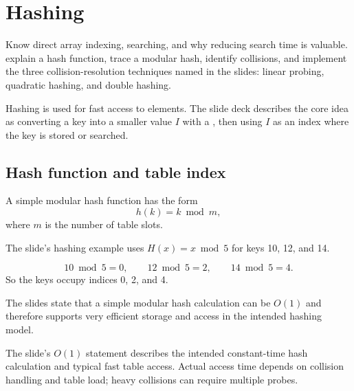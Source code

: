 \chapter{Hashing}\label{ch:hashing}

\chapterguide%
  {Know direct array indexing, searching, and why reducing search time is valuable.}
  {explain a hash function, trace a modular hash, identify collisions, and implement the three collision-resolution techniques named in the slides: linear probing, quadratic hashing, and double hashing.}

Hashing is used for fast access to elements. The slide deck describes the core idea as converting a key into a smaller value $I$ with a , then using $I$ as an index where the key is stored or searched.

\section{Hash function and table index}

A simple modular hash function has the form
\[
h(k)=k\bmod m,
\]
where $m$ is the number of table slots.

The slide's hashing example uses $H(x)=x\bmod5$ for keys 10, 12, and 14.

\begin{workedexample}
\[
10\bmod5=0,\qquad 12\bmod5=2,\qquad 14\bmod5=4.
\]
So the keys occupy indices 0, 2, and 4.
\end{workedexample}

\begin{mlfigure}
\end{mlfigure}

The slides state that a simple modular hash calculation can be $O(1)$ and therefore supports very efficient storage and access in the intended hashing model.

\begin{clarification}
The slide's $O(1)$ statement describes the intended constant-time hash calculation and typical fast table access. Actual access time depends on collision handling and table load; heavy collisions can require multiple probes.
\end{clarification}

